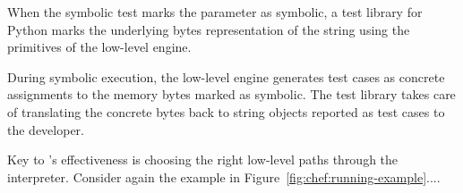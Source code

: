 When the symbolic test marks the  parameter as symbolic, a \chef test library for Python marks the underlying bytes representation of the string using the primitives of the low-level engine.

During symbolic execution, the low-level engine generates test cases as concrete assignments to the memory bytes marked as symbolic.
%
The \chef test library takes care of translating the concrete bytes back to string objects reported as test cases to the developer.

Key to \chef's effectiveness is choosing the right low-level paths through the interpreter.
%
Consider again the example in Figure~\ref{fig:chef:running-example}....

\fi




